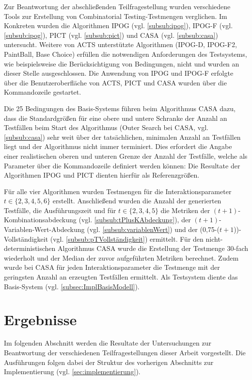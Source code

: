 Zur Beantwortung der abschließenden Teilfragestellung wurden verschiedene Tools zur Erstellung von Combinatorial Testing-Testmengen verglichen. Im Konkreten wurden die Algorithmen IPOG  (vgl. \autoref{subsub:ipog}), IPOG-F (vgl. \autoref{subsub:ipog}), PICT (vgl. \autoref{subsub:pict}) und CASA (vgl. \autoref{subsub:casa}) untersucht. Weitere von ACTS unterstützte Algorithmen (IPOG-D, IPOG-F2, PaintBall, Base Choice) erfüllen die notwendigen Anforderungen des Testsystems, wie beispielsweise die Berücksichtigung von Bedingungen, nicht und wurden an dieser Stelle ausgeschlossen. Die Anwendung von IPOG und IPOG-F erfolgte über die Benutzeroberfläche von ACTS, PICT und CASA wurden über die Kommandozeile gestartet.

Die 25 Bedingungen des Basis-Systems führen beim Algorithmus CASA dazu, dass die Standardgrößen für eine obere und untere Schranke der Anzahl an Testfällen beim Start des Algorithmus (Outer Search bei CASA, vgl. \autoref{subsub:casa}) sehr weit über der tatsächlichen, minimalen Anzahl an Testfällen liegt und der Algorithmus nicht immer terminiert. Dies erfordert die Angabe einer realistischen oberen und unteren Grenze der Anzahl der Testfälle, welche als Parameter über die Kommandozeile definiert werden können: Die Resultate der Algorithmen IPOG und PICT dienten hierfür als Referenzgrößen.

Für alle vier Algorithmen wurden Testmengen für die Interaktionsparameter $t \in \{2,3,4,5,6\}$ erstellt. Anschließend wurden die Anzahl der generierten Testfälle, die Ausführungszeit und für $t \in \{2,3,4,5\}$ die Metriken der $(t+1)$-Kombinationsabdeckung (vgl. \autoref{subsub:tPlusKAbdeckung}), der $(t+1)$-Variablen-Wert-Abdeckung (vgl. \autoref{subsub:variablenWert}) und der (0,75-($t+1$))-Vollständigkeit (vgl. \autoref{subsub:pTVollständigkeit}) ermittelt. Für den nicht-deterministischen Algorithmus CASA wurde die Erstellung der Testmenge 30-fach wiederholt und der Median der zuvor aufgeführten Metriken berechnet. Zudem wurde bei CASA für jeden Interaktionsparameter die Testmenge mit der geringsten Anzahl an erzeugten Testfällen ermittelt. Als Testsystem diente das Basis-System (vgl. \autoref{subsec:ImplBasisModell}). 

\section{Ergebnisse}\label{sec:results}

Im folgenden Abschnitt werden die Resultate der Untersuchungen zur Beantwortung der verschiedenen Teilfragestellungen dieser Arbeit vorgestellt. Die Ausführungen folgen dabei der Struktur des vorherigen Abschnitts zur Implementierung (vgl. \autoref{sec:implementierung}).

